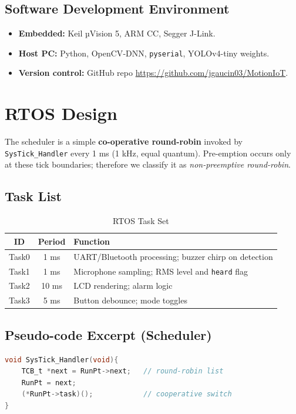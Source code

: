 \documentclass[11pt]{IEEEtran}
\begin{document}
\subsection{Software Development Environment}
\begin{itemize}
  \item \textbf{Embedded:} Keil µVision 5, ARM CC, Segger J-Link.
  \item \textbf{Host PC:} Python, OpenCV‐DNN, \verb|pyserial|, YOLOv4-tiny weights.
  \item \textbf{Version control:} GitHub repo \url{https://github.com/jgaucin03/MotionIoT}.
\end{itemize}

\section{RTOS Design}
The scheduler is a simple \textbf{co-operative round-robin} invoked by
\verb|SysTick_Handler| every 1 ms (1 kHz, equal quantum).  
Pre-emption occurs only at these tick boundaries; therefore we classify it
as \emph{non-preemptive round-robin}.

\subsection*{Task List}

\begin{table}[t]\centering
\caption{RTOS Task Set}\label{tab:tasks}
\begin{tabularx}{\columnwidth}{|c|c|X|}
\hline
\textbf{ID} & \textbf{Period} & \textbf{Function} \\ \hline
Task0 & 1 ms & UART/Bluetooth processing; buzzer chirp on detection \\ \hline
Task1 & 1 ms & Microphone sampling; RMS level and \texttt{heard} flag \\ \hline
Task2 & 10 ms & LCD rendering; alarm logic \\ \hline
Task3 & 5 ms & Button debounce; mode toggles \\ \hline
\end{tabularx}
\end{table}

\lstset{basicstyle=\ttfamily\footnotesize,breaklines=true}
\subsection*{Pseudo-code Excerpt (Scheduler)}
\begin{lstlisting}[language=C]
void SysTick_Handler(void){
    TCB_t *next = RunPt->next;   // round-robin list
    RunPt = next;
    (*RunPt->task)();            // cooperative switch
}
\end{lstlisting}
\end{document}
